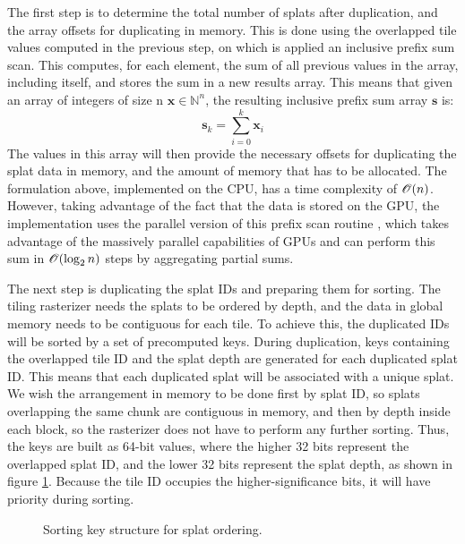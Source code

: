 The first step is to determine the total number of splats after duplication, and the array offsets for duplicating in memory. This is done using the overlapped tile values computed in the previous step, on which is applied an inclusive prefix sum scan. This computes, for each element, the sum of all previous values in the array, including itself, and stores the sum in a new results array. This means that given an array of integers of size n $\bm{x} \in \mathbb{N}^n$, the resulting inclusive prefix sum array $\bm{s}$ is:
\[
\bm{s}_k = \sum_{i=0}^{k} \bm{x}_i
\]
The values in this array will then provide the necessary offsets for duplicating the splat data in memory, and the amount of memory that has to be allocated. The formulation above, implemented on the CPU, has a time complexity of $\mathcal{O} (n)$. However, taking advantage of the fact that the data is stored on the GPU, the implementation uses the parallel version of this prefix scan routine \cite{Merrill2016SinglepassPP}, which takes advantage of the massively parallel capabilities of GPUs and can perform this sum in $\mathcal{O} (\log_2 n)$ steps by aggregating partial sums.

The next step is duplicating the splat IDs and preparing them for sorting. The tiling rasterizer needs the splats to be ordered by depth, and the data in global memory needs to be contiguous for each tile. To achieve this, the duplicated IDs will be sorted by a set of precomputed keys. During duplication, keys containing the overlapped tile ID and the splat depth are generated for each duplicated splat ID. This means that each duplicated splat will be associated with a unique splat. We wish the arrangement in memory to be done first by splat ID, so splats overlapping the same chunk are contiguous in memory, and then by depth inside each block, so the rasterizer does not have to perform any further sorting. Thus, the keys are built as 64-bit values, where the higher 32 bits represent the overlapped splat ID, and the lower 32 bits represent the splat depth, as shown in figure \ref{fig:sortkey}. Because the tile ID occupies the higher-significance bits, it will have priority during sorting.

\begin{figure}[H]
    \centering
    
    \caption{Sorting key structure for splat ordering.}
    \label{fig:sortkey}
\end{figure}


